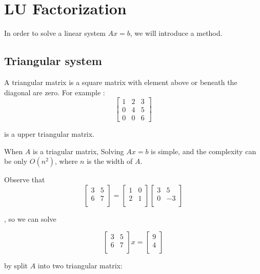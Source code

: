 \section{LU Factorization}

In order to solve a linear system $Ax = b$,
we will introduce a method.

\subsection{Triangular system}

A triangular matrix is a square matrix with element above or beneath the diagonal are zero.
For example :
\[
    \begin{bmatrix}
        1 & 2 & 3 \\ 
        0 & 4 & 5 \\ 
        0 & 0 & 6  
    \end{bmatrix}
\]

is a upper triangular matrix.

When $A$ is a triagular matrix, Solving $Ax = b$ is simple,
and the complexity can be only $O(n^2)$, where $n$ is the width of $A$.

Observe that
\[
    \begin{bmatrix}
        3 & 5 \\ 
        6 & 7 \\ 
    \end{bmatrix}
    =
    \begin{bmatrix}
        1 & 0 \\ 
        2 & 1 \\ 
    \end{bmatrix}
    \begin{bmatrix}
        3 & 5 \\ 
        0 & -3 \\ 
    \end{bmatrix}
\]

, so we can solve

\[
    \begin{bmatrix}
        3 & 5 \\ 
        6 & 7 \\ 
    \end{bmatrix}
    x=\begin{bmatrix}9 \\ 4 \\ \end{bmatrix}
\]

by split $A$ into two triangular matrix:

